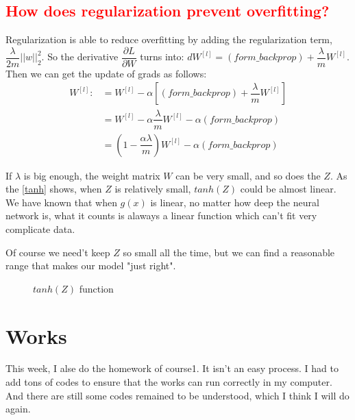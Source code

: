 \documentclass[10pt]{article}
\begin{document}
\subsection{\protect\textcolor{red}{How does regularization prevent overfitting?}}
\indent Regularization is able to reduce overfitting by adding the regularization term, $\dfrac{\lambda}{2m}||w||_{2}^{2}$. So the derivative $\dfrac{\partial L}{\partial W}$ turns into: $dW^{[l]}=(form\_backprop)+\dfrac{\lambda}{m}W^{[l]}$. Then we can get the update of grads as follows:
\begin{align}
W^{[l]}:&=W^{[l]}-\alpha [ (form\_backprop)+\dfrac{\lambda}{m}W^{[l]}]\\
&=W^{[l]}-\alpha\dfrac{\lambda}{m}W^{[l]}-\alpha(form\_backprop)\\
&=(1-\dfrac{\alpha\lambda}{m})W^{[l]}-\alpha(form\_backprop)
\end{align} 




\indent If $\lambda$ is big enough, the weight matrix $W$ can be very small, and so does the $Z$. As the \autoref{tanh} shows, when $Z$ is relatively small, $tanh(Z)$ could be almost linear. We have known that when $g(x)$ is linear, no matter how deep the neural network is, what it counts is alaways a linear function which can't fit very complicate data.

\indent Of course we need't keep $Z$ so small all the time, but we can find a reasonable range that makes our model "just right".

\begin{figure}[htbp]
\centering
{}
\caption{$tanh(Z)$ function}
\label{tanh}%
\end{figure}


\section{Works}
\indent This week, I alse do the homework of course1. It isn't an easy process. I had to add tons of codes to ensure that the works can run correctly in my computer. And there are still some codes remained to be understood, which I think I will do again.
\end{document}
